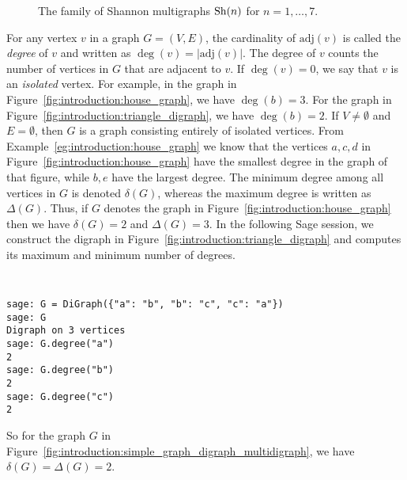 \begin{figure}[!htbp]
{
}
%
\caption{The family of Shannon multigraphs $\operatorname*{Sh}(n)$ for $n = 1,\dots,7$.}
\label{fig:introduction:Shannon_multigraphs}
\end{figure}

For any vertex $v$ in a graph $G = (V, E)$, the cardinality of
$\text{adj}(v)$ is called the \emph{degree} of $v$ and written as
$\deg(v) = |\text{adj}(v)|$. The degree of $v$ counts the number of
vertices in $G$ that are adjacent to $v$. If $\deg(v) = 0$, we say
that $v$ is an \emph{isolated} vertex. For example, in the graph in
Figure~\ref{fig:introduction:house_graph}, we have $\deg(b) = 3$. For
the graph in Figure~\ref{fig:introduction:triangle_digraph}, we have
$\deg(b) = 2$. If $V \neq \emptyset$ and $E = \emptyset$, then
$G$ is a graph consisting entirely of isolated vertices. From
Example~\ref{eg:introduction:house_graph} we know that the vertices
$a, c, d$ in Figure~\ref{fig:introduction:house_graph} have the
smallest degree in the graph of that figure, while $b, e$ have the
largest degree. The minimum degree among all vertices in $G$ is
denoted $\delta(G)$, whereas the maximum degree is written as
$\Delta(G)$. Thus, if $G$ denotes the graph in
Figure~\ref{fig:introduction:house_graph} then we have $\delta(G) = 2$
and $\Delta(G) = 3$. In the following Sage session, we construct the
digraph in Figure~\ref{fig:introduction:triangle_digraph} and computes
its maximum and minimum number of degrees.
\index{$\delta$}
\index{$\Delta$}
%
\begin{center}
\fontsize{9pt}{9pt}
\selectfont
\tt
\begin{lstlisting}
sage: G = DiGraph({"a": "b", "b": "c", "c": "a"})
sage: G
Digraph on 3 vertices
sage: G.degree("a")
2
sage: G.degree("b")
2
sage: G.degree("c")
2
\end{lstlisting}
\end{center}
%
So for the graph $G$ in
Figure~\ref{fig:introduction:simple_graph_digraph_multidigraph}, we have
$\delta(G) = \Delta(G) = 2$.

